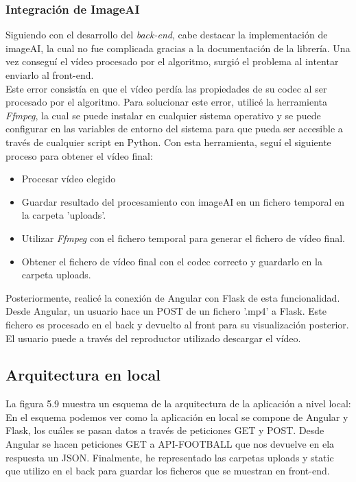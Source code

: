  \subsubsection{Integración de ImageAI}
 Siguiendo con el desarrollo del \textit{back-end}, cabe destacar la implementación de imageAI, la cual no fue complicada gracias a la documentación de la librería. Una vez conseguí el vídeo procesado por el algoritmo, surgió el problema al intentar enviarlo al front-end. \\
 Este error consistía en que el vídeo perdía las propiedades de su codec al ser procesado por el algoritmo. Para solucionar este error, utilicé la herramienta \textit{Ffmpeg}, la cual se puede instalar en cualquier sistema operativo y se puede configurar en las variables de entorno del sistema para que pueda ser accesible a través de cualquier script en Python. Con esta herramienta, seguí el siguiente proceso para obtener el vídeo final:
 
\begin{itemize}
    \item Procesar vídeo elegido
    \item Guardar resultado del procesamiento con imageAI en un fichero temporal en la carpeta 'uploads'.
    \item Utilizar \textit{Ffmpeg} con el fichero temporal para generar el fichero de vídeo final.
    \item Obtener el fichero de vídeo final con el codec correcto y guardarlo en la carpeta uploads.
\end{itemize}
Posteriormente, realicé la conexión de Angular con Flask de esta funcionalidad. Desde Angular, un usuario hace un POST de un fichero '.mp4' a Flask. Este fichero es procesado en el back y devuelto al front para su visualización posterior. El usuario puede a través del reproductor utilizado descargar el vídeo.

\subsection{Arquitectura en local}
La figura 5.9 muestra un esquema de la arquitectura de la aplicación a nivel local:
En el esquema podemos ver como la aplicación en local se compone de Angular y Flask, los cuáles se pasan datos a través de peticiones GET y POST. Desde Angular se hacen peticiones GET a API-FOOTBALL que nos devuelve en ela respuesta un JSON. Finalmente, he representado las carpetas uploads y static que utilizo en el back para guardar los ficheros que se muestran en front-end.

